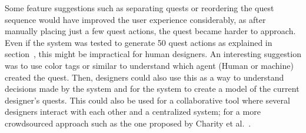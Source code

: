 

Some feature suggestions such as separating quests or reordering the quest sequence would have improved the user experience considerably, as after manually placing just a few quest actions, the quest became harder to approach. Even if the system was tested to generate 50 quest actions as explained in section~, this might be impractical for human designers. An interesting suggestion was to use color tags or similar to understand which agent (Human or machine) created the quest. Then, designers could also use this as a way to understand decisions made by the system and for the system to create a model of the current designer's quests. This could also be used for a collaborative tool where several designers interact with each other and a centralized system; for a more crowdsourced approach such as the one proposed by Charity et al.~.






